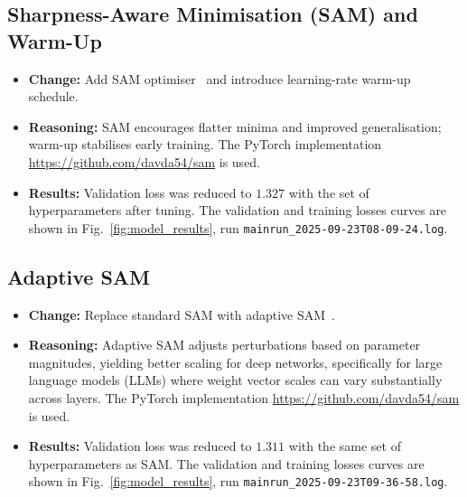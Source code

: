\documentclass[12pt]{article}
\begin{document}
\subsection{Sharpness-Aware Minimisation (SAM) and Warm-Up}
\begin{itemize}
  \item \textbf{Change:} Add SAM optimiser~\cite{sam} and introduce learning-rate warm-up schedule.
  \item \textbf{Reasoning:} SAM encourages flatter minima and improved generalisation; warm-up stabilises early training. The PyTorch implementation \url{https://github.com/davda54/sam} is used.
  \item \textbf{Results:} Validation loss was reduced to $1.327$ with the set of hyperparameters after tuning. The validation and training losses curves are shown in Fig.~\ref{fig:model_results},  run \texttt{mainrun\_2025-09-23T08-09-24.log}.
\end{itemize}

\subsection{Adaptive SAM}
\begin{itemize}
  \item \textbf{Change:} Replace standard SAM with adaptive SAM~\cite{asam}.
  \item \textbf{Reasoning:} Adaptive SAM adjusts perturbations based on parameter magnitudes, yielding better scaling for deep networks, specifically for large language models (LLMs) where weight vector scales can vary substantially across layers. The PyTorch implementation \url{https://github.com/davda54/sam} is used.
  \item \textbf{Results:} Validation loss was reduced to $1.311$ with the same set of hyperparameters as SAM. The validation and training losses curves are shown in Fig.~\ref{fig:model_results},  run \texttt{mainrun\_2025-09-23T09-36-58.log}.
\end{itemize}
\end{document}
